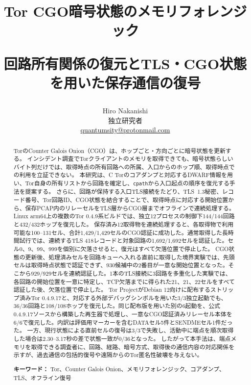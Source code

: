 \documentclass[10pt,a4paper]{ltjsarticle}
\title{\vspace{-8mm}
  \textbf{Tor CGO暗号状態のメモリフォレンジック}\par
  \large 回路所有関係の復元とTLS・CGO状態を用いた保存通信の復号}
\author{Hiro Nakanishi\\独立研究者\\\href{mailto:quantumsity@protonmail.com}{quantumsity@protonmail.com}}
\date{}
\newcommand{\code}[1]{\nolinkurl{#1}}
\begin{document}
\maketitle
\vspace{-5mm}

\begin{abstract}
TorのCounter Galois Onion（CGO）は、ホップごと・方向ごとに暗号状態を更新する。
インシデント調査でTorクライアントのメモリを取得できても、暗号状態らしいバイト列だけでは、取得時点の所有回路への所属、入口からのホップ順、取得時点での利用を立証できない。
本研究は、C Torのコアダンプと対応するDWARF情報を用い、Tor自身の所有リストから回路を確定し、\code{cpath}から入口起点の順序を復元する手法を提案する。
さらに、回路が保持する入口TLS接続をたどり、TLS~1.3秘密、レコード番号、Tor回路ID、CGO状態を結合することで、取得時点に対応する開始位置から、保存PCAP内のリレーセルをTLS層からCGO層までオフラインで連続処理する。
Linux arm64上の複数のTor 0.4.9系ビルドでは、独立12プロセスの制御下144/144回路と432/432ホップを復元した。
保存済み12取得物を連続処理すると、各取得物で利用可能な100--131セル、合計1,429/1,429セルのCGO認証に成功した。通常取得した長時間試行では、連続するTLS 418レコードと対象回路の1,692/1,692セルを認証した。セル0、9、99、999を個別に欠落させると、復元はすべて欠落位置で停止した。
CGO状態の更新後、処理済みセルを回路キューへ入れる直前に取得した境界実験では、先頭セルは取得時点状態で認証できず、930候補中の2番目が一意な開始位置となった。そこから929/929セルを連続認証した。1本のTLS接続に3回路を多重化した実験では、各回路の開始位置を一意に特定し、TCP欠落までに得られた21、21、22セルをすべて認証した後、欠落位置で停止した。
Tor ProjectがDebian 12向けに配布するストリップ済みTor 0.4.9.17と、対応する外部デバッグシンボルを用いた3/3独立起動でも、36/36回路と108/108ホップを復元した。同じ配布版を用いた別の6起動を、公式0.4.9.17ソースから構築した再生器で処理し、一意なCGO認証済みリレーセル本体を6/6で復元した。内訳は評価用マーカーを含むDATAセル5件とSENDMEセル1件だった。
一方、現行状態による直前セルの復号は3/3で失敗し、活動中に端点を順次取得した場合は2.30--3.17秒の差で状態一致が0/36となった。
したがって本手法は、端点メモリを取得できる調査者に、回路、経路、暗号方式、取得後の通信内容の対応関係を示すが、過去通信の包括的復号や遠隔からのTor匿名性破壊を与えない。

\noindent\textbf{キーワード：} Tor、Counter Galois Onion、メモリフォレンジック、コアダンプ、TLS、オフライン復号
\end{abstract}
\end{document}
